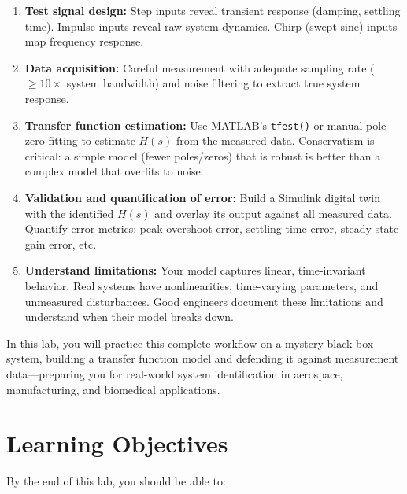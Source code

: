\documentclass[11pt,letterpaper]{article}
\begin{document}
\begin{enumerate}
    \item \textbf{Test signal design:} Step inputs reveal transient response (damping, settling time). Impulse inputs reveal raw system dynamics. Chirp (swept sine) inputs map frequency response.

    \item \textbf{Data acquisition:} Careful measurement with adequate sampling rate ($\geq 10 \times$ system bandwidth) and noise filtering to extract true system response.

    \item \textbf{Transfer function estimation:} Use MATLAB's \texttt{tfest()} or manual pole-zero fitting to estimate $H(s)$ from the measured data. Conservatism is critical: a simple model (fewer poles/zeros) that is robust is better than a complex model that overfits to noise.

    \item \textbf{Validation and quantification of error:} Build a Simulink digital twin with the identified $H(s)$ and overlay its output against all measured data. Quantify error metrics: peak overshoot error, settling time error, steady-state gain error, etc.

    \item \textbf{Understand limitations:} Your model captures linear, time-invariant behavior. Real systems have nonlinearities, time-varying parameters, and unmeasured disturbances. Good engineers document these limitations and understand when their model breaks down.
\end{enumerate}

\noindent
In this lab, you will practice this complete workflow on a mystery black-box system, building a transfer function model and defending it against measurement data—preparing you for real-world system identification in aerospace, manufacturing, and biomedical applications.

\clearpage

\section{Learning Objectives}

By the end of this lab, you should be able to:
\end{document}
